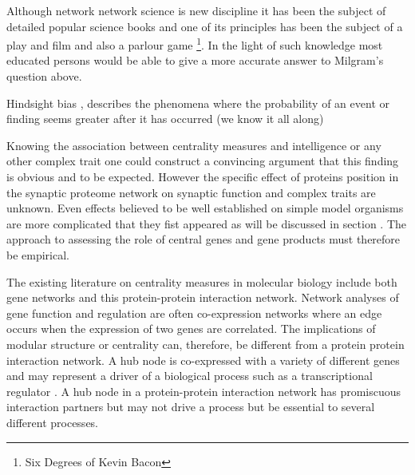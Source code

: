  Although network network science is new discipline it has been the subject of detailed popular science books \cite{barabasi2002linked} and one of its principles has been the subject of a play \cite{guare1990six} and film and also a parlour game \footnote{Six Degrees of Kevin Bacon}.\cite{collins1998s} In the light of such knowledge most educated persons would be able to give a more accurate answer to Milgram's question above. 

 
 
 Hindsight bias \cite{fischhoff1975hindsight} \cite{fischhoff2007early}, describes the phenomena where the probability of an event or finding seems greater after it has occurred (we know it all along)
 
Knowing the association between centrality measures and intelligence or any other complex trait one could construct a convincing argument that this finding is obvious and to be expected. However the specific effect of proteins position in the synaptic proteome network on synaptic function and complex traits are unknown. Even effects believed to be well established on simple model organisms are more complicated that they fist appeared as will be discussed in section . The approach to assessing the role of central genes and gene products must therefore be empirical. 
 
 The existing literature on centrality measures in molecular biology include both  gene networks and this protein-protein interaction network. Network analyses of gene function and regulation are often co-expression networks where an edge occurs when the expression of two genes are correlated.\cite{zhang2005general} The implications of modular structure or centrality can, therefore, be different from a protein protein interaction network. A hub node is co-expressed with a variety of different genes and may represent a driver of a biological process such as a transcriptional regulator \cite{parikshak2015systems}. A hub node in a protein-protein interaction network has promiscuous interaction partners but may not drive a process but be essential to several different processes. 
 

